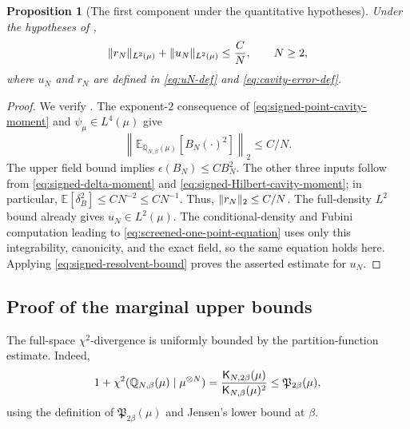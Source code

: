 \documentclass[11pt,reqno]{amsart}
\numberwithin{equation}{section}
\theoremstyle{plain}
\newtheorem{prop}[prop]{Proposition}
\theoremstyle{remark}
\DeclarePairedDelimiter{\pa}{\lparen}{\rparen}
\DeclarePairedDelimiter{\norm}{\lVert}{\rVert}
\newcommand{\E}{{\mathbb{E}}}
\newcommand{\Q}{{\mathbb{Q}}}
\newcommand{\K}{{\mathsf{K}}}
\newcommand{\be}{\beta}
\newcommand{\Chi}{\chi^2}
\begin{document}
\begin{prop}[The first component under the quantitative hypotheses]
\label{prop:signed-onepoint-bound}
Under the hypotheses of ,
\begin{equation}\label{eq:signed-onepoint-bound}
 \norm{r_N}_{L^2(\mu)}+\norm{u_N}_{L^2(\mu)}\leq\frac C N,
 \qquad N\geq2,
\end{equation}
where $u_N$ and $r_N$ are defined in \eqref{eq:uN-def} and
\eqref{eq:cavity-error-def}.
\end{prop}
\begin{proof}
We verify .  The exponent-$2$
consequence of \eqref{eq:signed-point-cavity-moment} and
$\psi_\mu\in L^4(\mu)$ give
\begin{equation}\label{eq:signed-expected-cavity-square}
 \left\|\E_{\Q_{N,\be}(\mu)}[B_N(\cdot)^2]\right\|_2\leq C/N.
\end{equation}
The upper field bound implies $\epsilon(B_N)\leq CB_N^2$.
The other three inputs follow from \eqref{eq:signed-delta-moment} and
\eqref{eq:signed-Hilbert-cavity-moment}; in particular,
$\E[\delta_B^2]\leq CN^{-2}\leq CN^{-1}$.
Thus, $\norm{r_N}_2\leq C/N$.  The full-density $L^2$ bound already gives
$u_N\in L^2(\mu)$.  The conditional-density and Fubini computation leading
to \eqref{eq:screened-one-point-equation} uses only this integrability,
canonicity, and the exact field, so the same equation holds here.  Applying
\eqref{eq:signed-resolvent-bound} proves the asserted estimate for $u_N$.
\end{proof}

\subsection{Proof of the marginal upper bounds}
\label{subsec:order-upper-conclusion}\label{sec:hoeffding-projection-upper-bound}

The full-space \(\chi^2\)-divergence is uniformly bounded by the partition-function estimate.  Indeed,
\begin{align}\label{eq:full-chi2-partition-ratio}
 1+\Chi\pa{\Q_{N,\be}(\mu)\mid\mu^{\otimes N}}
 =\frac{\K_{N,2\be}(\mu)}{\K_{N,\be}(\mu)^2}
 \le \mathfrak P_{2\be}(\mu),
\end{align}
using the definition of \(\mathfrak P_{2\be}(\mu)\) and Jensen's lower bound at \(\be\).
\end{document}
